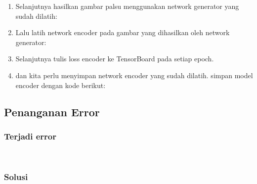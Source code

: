 \begin{enumerate}
\item Selanjutnya hasilkan gambar palsu menggunakan network generator yang sudah dilatih:


\item Lalu latih network encoder pada gambar yang dihasilkan oleh network generator:


\item Selanjutnya tulis loss encoder ke TensorBoard pada setiap epoch.


\item dan kita perlu menyimpan network encoder yang sudah dilatih. simpan model encoder dengan kode berikut:

\end{enumerate}

\subsection{Penanganan Error}
\subsubsection{Terjadi error}
\hfill\\

\subsubsection{Solusi}
\hfill\\

